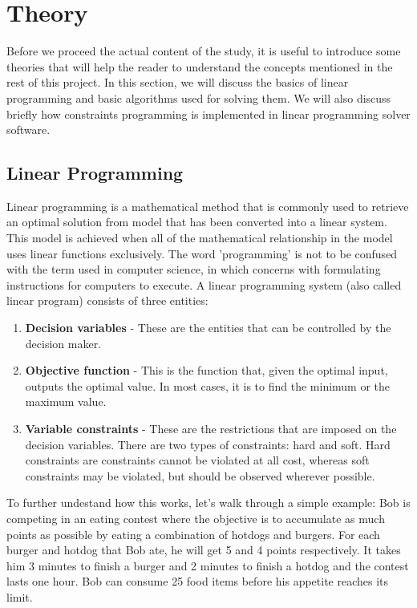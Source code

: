 \chapter{Theory}
Before we proceed the actual content of the study, it is useful to introduce some theories that will help the reader
to understand the concepts mentioned in the rest of this project. In this section, we will discuss the basics of
linear programming and basic algorithms used for solving them. We will
also discuss briefly how constraints programming is implemented in linear programming solver software.

\section{Linear Programming}
Linear programming is a mathematical method that is commonly used to retrieve an optimal solution from model
that has been converted into a linear system. This model is achieved when all of the mathematical relationship in the model
uses linear functions exclusively. The word 'programming' is not to be confused with the term used in computer science,
in which concerns with formulating instructions for computers to execute. A linear programming system (also called linear
program) consists of three entities:
\begin{enumerate}
\item \textbf{Decision variables} - These are the entities that can be controlled by the decision maker.
\item \textbf{Objective function} - This is the function that, given the optimal input, outputs the optimal value.
In most cases, it is to find the minimum or the maximum value.
\item \textbf{Variable constraints} - These are the restrictions that are imposed on the decision variables. There are two types
of constraints: hard and soft. Hard constraints are constraints cannot be violated at all cost, whereas soft constraints may be
violated, but should be observed wherever possible.
\end{enumerate}
To further undestand how this works, let's walk through a simple example: Bob is competing in
an eating contest where the objective is to accumulate as much points as possible by eating a combination of hotdogs and burgers.
For each burger and hotdog that Bob ate, he will get 5 and 4 points respectively. It takes him 3 minutes to finish a burger and
2 minutes to finish a hotdog and the contest lasts one hour. Bob can consume 25 food items before his appetite reaches its limit.

